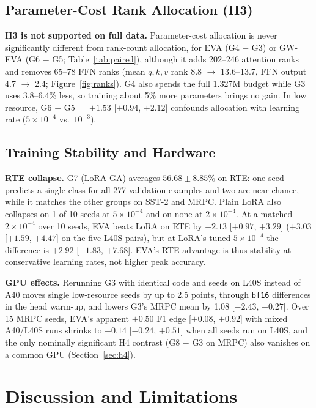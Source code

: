\documentclass[letterpaper]{article} %
\begin{document}
\subsection{Parameter-Cost Rank Allocation (H3)}


\textbf{H3 is not supported on full data.} Parameter-cost allocation is never significantly different from rank-count allocation, for EVA (G4 $-$ G3) or GW-EVA (G6 $-$ G5; Table~\ref{tab:paired}), although it adds 202--246 attention ranks and removes 65--78 FFN ranks (mean $q,k,v$ rank 8.8 $\to$ 13.6--13.7, FFN output 4.7 $\to$ 2.4; Figure~\ref{fig:ranks}). G4 also spends the full 1.327M budget while G3 uses 3.8--6.4\% less, so training about 5\% more parameters brings no gain. In low resource, G6 $-$ G5 $=+1.53$ [$+0.94$, $+2.12$] confounds allocation with learning rate ($5\times10^{-4}$ vs.\ $10^{-3}$).

\subsection{Training Stability and Hardware}
\textbf{RTE collapse.} G7 (LoRA-GA) averages $56.68\pm8.85\%$ on RTE: one seed predicts a single class for all 277 validation examples and two are near chance, while it matches the other groups on SST-2 and MRPC. Plain LoRA also collapses on 1 of 10 seeds at $5\times10^{-4}$ and on none at $2\times10^{-4}$. At a matched $2\times10^{-4}$ over 10 seeds, EVA beats LoRA on RTE by $+2.13$ [$+0.97$, $+3.29$] ($+3.03$ [$+1.59$, $+4.47$] on the five L40S pairs), but at LoRA's tuned $5\times10^{-4}$ the difference is $+2.92$ [$-1.83$, $+7.68$]. EVA's RTE advantage is thus stability at conservative learning rates, not higher peak accuracy.

\label{sec:gpu}\textbf{GPU effects.} Rerunning G3 with identical code and seeds on L40S instead of A40 moves single low-resource seeds by up to 2.5 points, through \texttt{bf16} differences in the head warm-up, and lowers G3's MRPC mean by 1.08 [$-2.43$, $+0.27$]. Over 15 MRPC seeds, EVA's apparent $+0.50$ F1 edge [$+0.08$, $+0.92$] with mixed A40/L40S runs shrinks to $+0.14$ [$-0.24$, $+0.51$] when all seeds run on L40S, and the only nominally significant H4 contrast (G8 $-$ G3 on MRPC) also vanishes on a common GPU (Section~\ref{sec:h4}).

\section{Discussion and Limitations}
\end{document}
